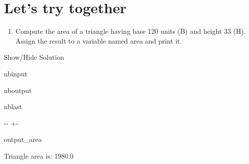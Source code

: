 \documentclass[letterpaper,10pt,english]{sphinxmanual}
\begin{document}
\section{Let’s try together}
\label{\detokenize{M1_practical1:Let's-try-together}}\begin{enumerate}
%
\item {} 
\sphinxAtStartPar
Compute the area of a triangle having base 120 units (B) and height 33 (H). Assign the result to a variable named area and print it.

\end{enumerate}



\sphinxAtStartPar
Show/Hide Solution





\begin{sphinxuseclass}{nbinput}
{
\begin{sphinxVerbatim}[commandchars=\\\{\}]
\llap{\color{nbsphinxin}[17]:\,\hspace{\fboxrule}\hspace{\fboxsep}}  
  
  
 
\end{sphinxVerbatim}
}

\end{sphinxuseclass}
\begin{sphinxuseclass}{nboutput}
\begin{sphinxuseclass}{nblast}
{

\kern-\sphinxverbatimsmallskipamount\kern-\baselineskip
\kern+\FrameHeightAdjust\kern-\fboxrule
\vspace{\nbsphinxcodecellspacing}

\begin{sphinxuseclass}{output_area}
\begin{sphinxuseclass}{}


\begin{sphinxVerbatim}[commandchars=\\\{\}]
Triangle area is: 1980.0
\end{sphinxVerbatim}



\end{sphinxuseclass}
\end{sphinxuseclass}
}

\end{sphinxuseclass}
\end{sphinxuseclass}
\end{document}
